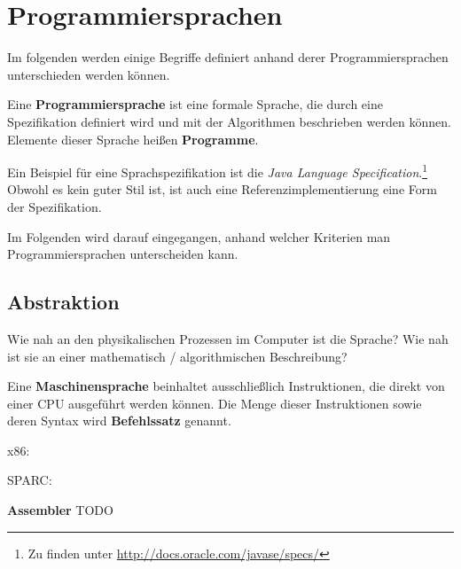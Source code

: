 \chapter{Programmiersprachen}
Im folgenden werden einige Begriffe definiert anhand derer
Programmiersprachen unterschieden werden können.

\begin{definition}%
    Eine \textbf{Programmiersprache} ist eine formale Sprache, die durch eine
    Spezifikation definiert wird und mit der Algorithmen beschrieben werden
    können. Elemente dieser Sprache heißen \textbf{Programme}.
\end{definition}

Ein Beispiel für eine Sprachspezifikation ist die \textit{Java Language Specification}.\footnote{Zu finden unter \url{http://docs.oracle.com/javase/specs/}} Obwohl es kein guter Stil ist, ist auch
eine Referenzimplementierung eine Form der Spezifikation.

Im Folgenden wird darauf eingegangen, anhand welcher Kriterien man 
Programmiersprachen unterscheiden kann.

\section{Abstraktion}
Wie nah an den physikalischen Prozessen im Computer ist die Sprache?
Wie nah ist sie an einer mathematisch / algorithmischen Beschreibung?

\begin{definition}%
    Eine \textbf{Maschinensprache} beinhaltet ausschließlich Instruktionen, die direkt
    von einer CPU ausgeführt werden können. Die Menge dieser Instruktionen 
    sowie deren Syntax wird \textbf{Befehlssatz} genannt.
\end{definition}

\begin{beispiel}[Maschinensprachen]
    \begin{bspenum}
        \item {}x86: 
        \item {}SPARC:
    \end{bspenum}
\end{beispiel}

\begin{definition}%
    \textbf{Assembler} TODO
\end{definition}

